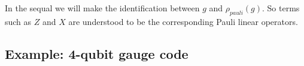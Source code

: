 \documentclass[12pt,notitlepage,longbibliography,nofootinbib,tightenlines]{revtex4}
\begin{document}
%
%
%
%



%
%
%

In the sequal we will make the identification
between $g$ and $\rho_{pauli}(g)$.
So terms such as $Z$ and $X$ are understood
to be the corresponding Pauli linear operators.

%
%

\subsection{Example: 4-qubit gauge code}
\end{document}
